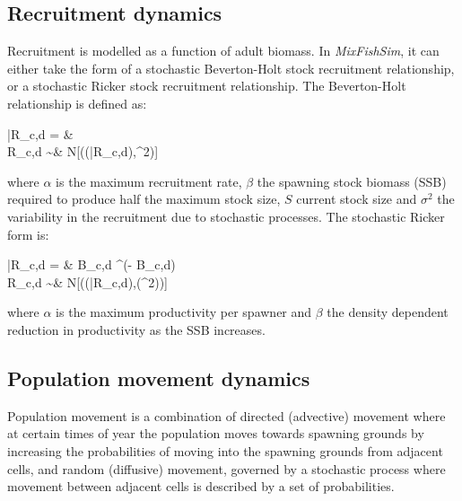 \documentclass[review]{elsarticle}
\let\oldequation\equation
\let\oldendequation\endequation
\renewenvironment{equation}
 {\linenomathNonumbers\oldequation}
 {\oldendequation\endlinenomath}
\begin{document}
\subsection{Recruitment dynamics}

Recruitment is modelled as a function of adult biomass. In
\textit{MixFishSim}, it can either take the form of a stochastic Beverton-Holt
stock recruitment relationship, or a stochastic Ricker stock recruitment
relationship. The Beverton-Holt relationship is defined as\citep{Beverton1957}: 
\begin{equation}
	\begin{split}
	\bar{R}_{c,d} = &  \\
	     R_{c,d} \sim & \log N[(\log(\bar{R}_{c,d}),\sigma^2)]
	\end{split}
\end{equation}
where $\alpha$ is the maximum recruitment rate, $\beta$ the spawning stock
biomass (SSB) required to produce half the maximum stock size, $S$ current
stock size and $\sigma^2$ the variability in the recruitment due to stochastic
processes. The stochastic Ricker form \citep{Ricker1954} is:
\begin{equation}
	\begin{split}
	\bar{R}_{c,d} = & B_{c,d} \cdot {}^{(\alpha - \beta \cdot B_{c,d})} \\	
   	     R_{c,d} \sim & \log N[(\log(\bar{R}_{c,d}),\log(\sigma^2))]
	\end{split}
\end{equation}
where $\alpha$ is the maximum productivity per spawner and $\beta$ the density
dependent reduction in productivity as the SSB increases. 

\subsection{Population movement dynamics}

Population movement is a combination of directed (advective) movement where at
certain times of year the population moves towards spawning grounds by
increasing the probabilities of moving into the spawning grounds from adjacent
cells, and random (diffusive) movement, governed by a stochastic process where
movement between adjacent cells is described by a set of probabilities.\\
\end{document}
